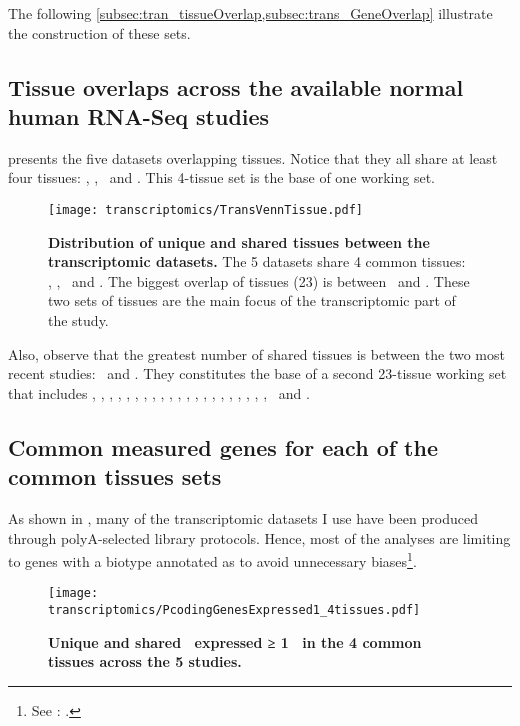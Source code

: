 The following \cref{subsec:tran_tissueOverlap,subsec:trans_GeneOverlap}
illustrate the construction of these sets.

\subsection{Tissue overlaps across the available normal human RNA-Seq studies}
\label{subsec:tran_tissueOverlap}

 presents the five datasets overlapping tissues.
Notice that they all share at least four tissues:
\heart, \kidney, \liver\ and \testis.
This 4-tissue set is the base of one working set.

\begin{figure}[h]%
\texttt{[image: transcriptomics/TransVennTissue.pdf]}\centering
\caption[Distribution of unique and shared tissues between the
transcriptomic datasets]
{\label{fig:VennStudiesT}\textbf{Distribution of unique and shared tissues
between the transcriptomic datasets.} The 5 datasets share 4
common tissues: \heart, \kidney, \liver\ and \testis.
The biggest overlap of tissues (23) is between \uhlen\ and \gtex.
These two sets of tissues are the main focus of the transcriptomic part of the
study.}
\end{figure}

Also, observe that the greatest number of shared tissues is
between the two most recent studies:
\uhlen\ and \gtex.
They constitutes the base of a second 23-tissue working set that includes
\Adipose, \Adrenal, \Bladder, \Cortex, \hcolon, \Esophagus,
\Fallopian, \heart, \kidney, \liver, \lung, \Ovary, \Pancreas, \Prostate,
\salivary, \skeletal, \skin, \intestine, \spleen, \stomach, \testis,
\thyroid\ and \uterus.

\subsection{Common measured genes for each of the common tissues sets}
\label{subsec:trans_GeneOverlap}
As shown in ,
many of the transcriptomic datasets I use have been produced through
polyA-selected library protocols.
Hence, most of the analyses are limiting to genes with a biotype annotated as
\emph{\pc}
to avoid unnecessary biases\footnote{See
: .}.

\begin{figure}[!htpb]
    \texttt{[image: transcriptomics/PcodingGenesExpressed1\_4tissues.pdf]}\centering
    \caption[Unique and shared \pcgs\ expressed
    in the 4 common tissues (≥1 \FPKM)]{\label{fig:ExpGenePcoding1}\textbf{Unique
    and shared \pcgs\ expressed ≥ 1 \FPKM\ in the 4 common tissues
    across the 5 studies.}}
\end{figure}

